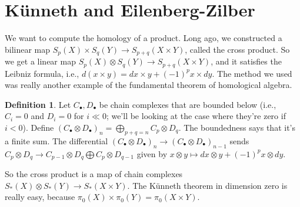 \documentclass{amsart}
\theoremstyle{theorem}
\theoremstyle{definition}
\newtheorem{definition}[theorem]{Definition}
\begin{document}
\section{K\"{u}nneth and Eilenberg-Zilber}
We want to compute the homology of a product. Long ago, we constructed a bilinear map $S_p(X)\times S_q(Y)\to S_{p+q}(X\times Y)$, called the cross product. So we get a linear map $S_p(X)\otimes S_q(Y)\to S_{p+q}(X\times Y)$, and it satisfies the Leibniz formula, i.e., $d(x\times y)=dx\times y+(-1)^px\times dy$. The method we used was really another example of the fundamental theorem of homological algebra.
\begin{definition}
Let $C_\bullet,D_\bullet$ be chain complexes that are bounded below (i.e., $C_i=0$ and $D_i=0$ for $i\ll 0$; we'll be looking at the case where they're zero if $i<0$). Define $(C_\bullet\otimes D_\bullet)_n=\bigoplus_{p+q=n}C_p\otimes D_q$. The boundedness says that it's a finite sum. The differential $(C_\bullet\otimes D_\bullet)_n\to (C_\bullet\otimes D_\bullet)_{n-1}$ sends $C_p\otimes D_q\to C_{p-1}\otimes D_q\bigoplus C_p\otimes D_{q-1}$ given by $x\otimes y\mapsto dx\otimes y+(-1)^p x\otimes dy$.
\end{definition}
So the cross product is a map of chain complexes $S_\ast(X)\otimes S_\ast(Y)\to S_\ast(X\times Y)$. The K\"{u}nneth theorem in dimension zero is really easy, because $\pi_0(X)\times \pi_0(Y)=\pi_0(X\times Y)$.
\end{document}
